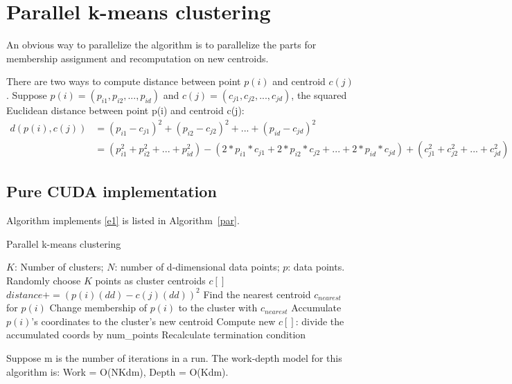 \section{Parallel k-means clustering}
An obvious way to parallelize the algorithm is to parallelize the
parts for membership assignment and recomputation on new centroids.

There are two ways to compute distance between point $p(i)$
and centroid $c(j)$. Suppose $p(i) = (p_{i1}, p_{i2}, ..., p_{id})$ and $c(j) = (c_{j1},
c_{j2}, ..., c_{jd})$, the squared Euclidean distance between point p(i) and centroid c(j): 
\begin{align}
d(p(i),c(j)) &= (p_{i1} - c_{j1})^2 + (p_{i2} - c_{j2})^2 + ... + (p_{id} - c_{jd})^2 \label{e1}\\
&= (p_{i1}^2 + p_{i2}^2 + ... + p_{id}^2) - (2*p_{i1}*c_{j1} + 2*p_{i2}*c_{j2} + ... + 2*p_{id}*c_{jd})
+ (c_{j1}^2 + c_{j2}^2 + ... + c_{jd}^2) \label{e2}
\end{align}

\subsection{Pure CUDA implementation}
Algorithm implements \ref{e1} is listed in Algorithm~\ref{par}. 
\begin{algorithm}[!h]
  \caption{Parallel k-means clustering} \label{par}
  \begin{algorithmic}[1]
    \INPUT $K$: Number of clusters; $N$: number of d-dimensional data points; $p$: data points.
     \label{alg:p}
    \State Randomly choose $K$ points as cluster centroids $c[]$
    \State $distance += (p(i)(dd) - c(j)(dd))^2$
    \EndFor
    \EndFor
    \State Find the nearest centroid $c_{nearest}$ for $p(i)$
    \State Change membership of $p(i)$ to the cluster with $c_{nearest}$
    \State Accumulate $p(i)$'s coordinates to the cluster's new centroid
    \EndParFor
    \State Compute new $c[]$: divide the accumulated coords by num\_points
    \State Recalculate termination condition
    \EndWhile
    \EndFunction  
  \end{algorithmic}
\end{algorithm}
Suppose m is the number of iterations in a run. The work-depth model for this algorithm is:
Work = O(NKdm), Depth = O(Kdm).

